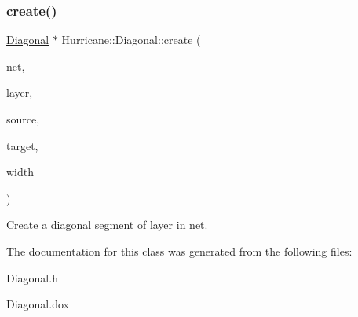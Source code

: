 \subsubsection{\texorpdfstring{create()}{create()}}
{\footnotesize\ttfamily \mbox{\hyperlink{classHurricane_1_1Diagonal}{Diagonal}} $\ast$ Hurricane\+::\+Diagonal\+::create (\begin{DoxyParamCaption}\item[{\mbox{\hyperlink{classHurricane_1_1Net}{Net}} $\ast$}]{net,  }\item[{const \mbox{\hyperlink{classHurricane_1_1Layer}{Layer}} $\ast$}]{layer,  }\item[{const \mbox{\hyperlink{classHurricane_1_1Point}{Point}} \&}]{source,  }\item[{const \mbox{\hyperlink{classHurricane_1_1Point}{Point}} \&}]{target,  }\item[{\mbox{\hyperlink{group__DbUGroup_ga4fbfa3e8c89347af76c9628ea06c4146}{Db\+U\+::\+Unit}}}]{width }\end{DoxyParamCaption})\hspace{0.3cm}{\ttfamily [static]}}

Create a diagonal segment of {\ttfamily layer} in {\ttfamily net}. 

The documentation for this class was generated from the following files\+:\begin{DoxyCompactItemize}
\item 
Diagonal.\+h\item 
Diagonal.\+dox\end{DoxyCompactItemize}
